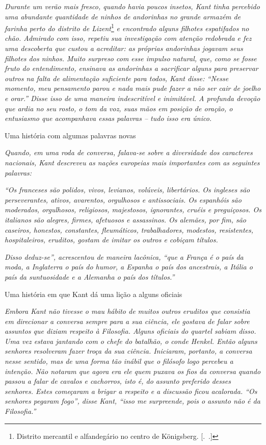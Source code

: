 \emph{Durante um verão mais fresco, quando havia poucos insetos, Kant
tinha percebido uma abundante quantidade de ninhos de andorinhas no
grande armazém de farinha perto do distrito de Lizent}\footnote{Distrito
  mercantil e alfandegário no centro de Königsberg. [.~.]}
\emph{e encontrado alguns filhotes espatifados no chão. Admirado com
isso, repetiu sua investigação com atenção redobrada e fez uma
descoberta que custou a acreditar: as próprias andorinhas jogavam seus
filhotes dos ninhos. Muito surpreso com esse impulso natural, que, como
se fosse fruto do entendimento, ensinava as andorinhas a sacrificar alguns para preservar outros na falta de alimentação suficiente para
todos, Kant disse: ``Nesse momento, meu pensamento parou e nada mais
pude fazer a não ser cair de joelho e orar.'' Disse isso de uma maneira
indescritível e inimitável. A profunda devoção que ardia no seu rosto, o
tom da voz, suas mãos em posição de oração, o entusiasmo que acompanhava
essas palavras -- tudo isso era único.}\bigskip

Uma história com algumas palavras novas

\emph{Quando, em uma roda de conversa, falava-se sobre a diversidade dos
caracteres nacionais, Kant descreveu as nações europeias mais
importantes com as seguintes palavras:}

\emph{``Os franceses são polidos, vivos, levianos, volúveis,
libertários. Os ingleses são perseverantes, ativos, avarentos,
orgulhosos e antissociais. Os espanhóis são moderados, orgulhosos,
religiosos, majestosos, ignorantes, cruéis e preguiçosos. Os italianos
são alegres, firmes, afetuosos e assassinos. Os alemães, por fim, são
caseiros, honestos, constantes, fleumáticos, trabalhadores, modestos,
resistentes, hospitaleiros, eruditos, gostam de imitar os outros e
cobiçam títulos.}

\emph{Disso deduz-se'', acrescentou de maneira lacônica, ``que a França
é o país da moda, a Inglaterra o país do humor, a Espanha o país dos
ancestrais, a Itália o país da suntuosidade e a Alemanha o país dos
títulos.''}\bigskip

Uma história em que Kant dá uma lição a alguns oficiais

\emph{Embora Kant não tivesse o mau hábito de muitos outros eruditos que
consistia em direcionar a conversa sempre para a sua ciência, ele
gostava de falar sobre assuntos que diziam respeito à Filosofia. Alguns
oficiais do quartel sabiam disso. Uma vez estava jantando com o chefe do
batalhão, o conde Henkel. Então alguns senhores resolveram fazer troça
da sua ciência. Iniciaram, portanto, a conversa nesse sentido, mas de
uma forma tão inábil que o filósofo logo percebeu a intenção. Não
notaram que agora era ele quem puxava os fios da conversa quando passou
a falar de cavalos e cachorros, isto é, do assunto preferido desses
senhores. Estes começaram a brigar a respeito e a discussão ficou
acalorada. ``Os senhores pegaram fogo'', disse Kant, ``isso me
surpreende, pois o assunto não é da Filosofia.''}\bigskip

